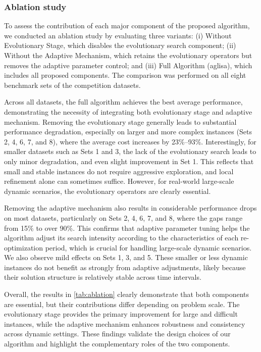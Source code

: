 \documentclass[]{interact}
\begin{document}
\subsubsection{Ablation study}
To assess the contribution of each major component of the proposed algorithm, we conducted an ablation study by evaluating three variants: (i) Without Evolutionary Stage, which disables the evolutionary search component; (ii) Without the Adaptive Mechanism, which retains the evolutionary operators but removes the adaptive parameter control; and (iii) Full Algorithm (\gls{aglisa}), which includes all proposed components. The comparison was performed on all eight benchmark sets of the competition datasets.

Across all datasets, the full algorithm achieves the best average performance, demonstrating the necessity of integrating both evolutionary stage and adaptive mechanism. Removing the evolutionary stage generally leads to substantial performance degradation, especially on larger and more complex instances (Sets 2, 4, 6, 7, and 8), where the average cost increases by 23\%–93\%. Interestingly, for smaller datasets such as Sets 1 and 3, the lack of the evolutionary search leads to only minor degradation, and even slight improvement in Set 1. This reflects that small and stable instances do not require aggressive exploration, and local refinement alone can sometimes suffice. However, for real-world large-scale dynamic scenarios, the evolutionary operators are clearly essential.

Removing the adaptive mechanism also results in considerable performance drops on most datasets, particularly on Sets 2, 4, 6, 7, and 8, where the gaps range from 15\% to over 90\%. This confirms that adaptive parameter tuning helps the algorithm adjust its search intensity according to the characteristics of each re-optimization period, which is crucial for handling large-scale dynamic scenarios. We also observe mild effects on Sets 1, 3, and 5. These smaller or less dynamic instances do not benefit as strongly from adaptive adjustments, likely because their solution structure is relatively stable across time intervals.

Overall, the results in \autoref{tab:ablation} clearly demonstrate that both components are essential, but their contributions differ depending on problem scale. The evolutionary stage provides the primary improvement for large and difficult instances, while the adaptive mechanism enhances robustness and consistency across dynamic settings. These findings validate the design choices of our algorithm and highlight the complementary roles of the two components.
\end{document}
